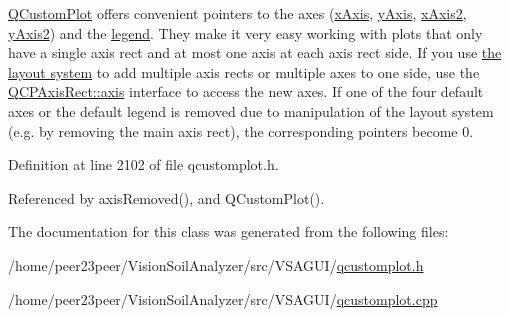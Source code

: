\hyperlink{class_q_custom_plot}{Q\+Custom\+Plot} offers convenient pointers to the axes (\hyperlink{class_q_custom_plot_a9a79cd0158a4c7f30cbc702f0fd800e4}{x\+Axis}, \hyperlink{class_q_custom_plot_af6fea5679725b152c14facd920b19367}{y\+Axis}, \hyperlink{class_q_custom_plot_ada41599f22cad901c030f3dcbdd82fd9}{x\+Axis2}, \hyperlink{class_q_custom_plot_af13fdc5bce7d0fabd640f13ba805c0b7}{y\+Axis2}) and the \hyperlink{class_q_custom_plot_a4eadcd237dc6a09938b68b16877fa6af}{legend}. They make it very easy working with plots that only have a single axis rect and at most one axis at each axis rect side. If you use \hyperlink{}{the layout system} to add multiple axis rects or multiple axes to one side, use the \hyperlink{class_q_c_p_axis_rect_a560de44e47a4af0f86c59102a094b1e4}{Q\+C\+P\+Axis\+Rect\+::axis} interface to access the new axes. If one of the four default axes or the default legend is removed due to manipulation of the layout system (e.\+g. by removing the main axis rect), the corresponding pointers become 0. 

Definition at line 2102 of file qcustomplot.\+h.



Referenced by axis\+Removed(), and Q\+Custom\+Plot().



The documentation for this class was generated from the following files\+:\begin{DoxyCompactItemize}
\item 
/home/peer23peer/\+Vision\+Soil\+Analyzer/src/\+V\+S\+A\+G\+U\+I/\hyperlink{qcustomplot_8h}{qcustomplot.\+h}\item 
/home/peer23peer/\+Vision\+Soil\+Analyzer/src/\+V\+S\+A\+G\+U\+I/\hyperlink{qcustomplot_8cpp}{qcustomplot.\+cpp}\end{DoxyCompactItemize}
